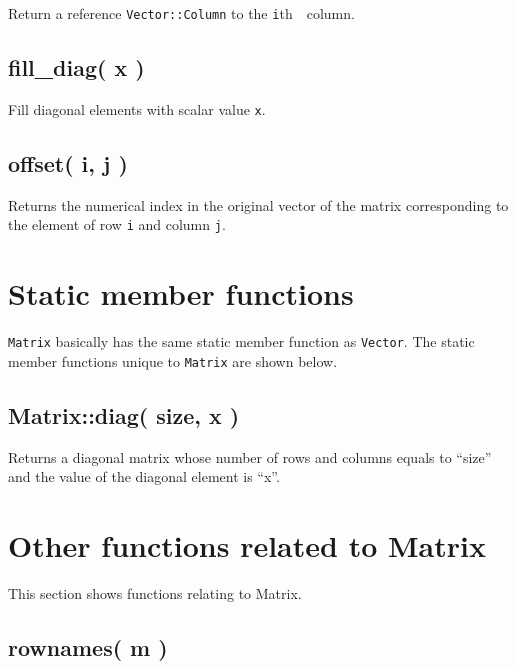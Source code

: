 \documentclass[]{book}
\begin{document}
Return a reference \texttt{Vector::Column} to the \texttt{i}th　column.

\hypertarget{fill_diag-x}{%
\subsection{fill\_diag( x )}\label{fill_diag-x}}

Fill diagonal elements with scalar value \texttt{x}.

\hypertarget{offset-i-j}{%
\subsection{offset( i, j )}\label{offset-i-j}}

Returns the numerical index in the original vector of the matrix corresponding to the element of row \texttt{i} and column \texttt{j}.

\hypertarget{static-member-functions-1}{%
\section{Static member functions}\label{static-member-functions-1}}

\texttt{Matrix} basically has the same static member function as \texttt{Vector}. The static member functions unique to \texttt{Matrix} are shown below.

\hypertarget{matrixdiag-size-x}{%
\subsection{Matrix::diag( size, x )}\label{matrixdiag-size-x}}

Returns a diagonal matrix whose number of rows and columns equals to ``size'' and the value of the diagonal element is ``x''.

\hypertarget{other-functions-related-to-matrix}{%
\section{Other functions related to Matrix}\label{other-functions-related-to-matrix}}

This section shows functions relating to Matrix.

\hypertarget{rownames-m}{%
\subsection{rownames( m )}\label{rownames-m}}
\end{document}
